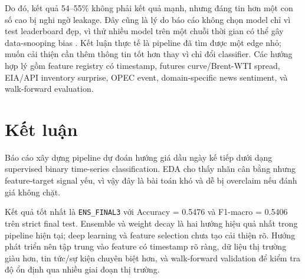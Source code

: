 \documentclass[10pt,a4paper]{article}
\newcommand{\code}[1]{\texttt{#1}}
\begin{document}
Do đó, kết quả 54--55\% không phải kết quả mạnh, nhưng đáng tin hơn một con số cao bị nghi ngờ leakage. Đây cũng là lý do báo cáo không chọn model chỉ vì test leaderboard đẹp, vì thử nhiều model trên một chuỗi thời gian có thể gây data-snooping bias \cite{white2000,cawley2010}. Kết luận thực tế là pipeline đã tìm được một edge nhỏ; muốn cải thiện cần thêm thông tin tốt hơn thay vì chỉ đổi classifier. Các hướng hợp lý gồm feature registry có timestamp, futures curve/Brent-WTI spread, EIA/API inventory surprise, OPEC event, domain-specific news sentiment, và walk-forward evaluation.

\section{Kết luận}

Báo cáo xây dựng pipeline dự đoán hướng giá dầu ngày kế tiếp dưới dạng supervised binary time-series classification. EDA cho thấy nhãn cân bằng nhưng feature-target signal yếu, vì vậy đây là bài toán khó và dễ bị overclaim nếu đánh giá không chặt.

Kết quả tốt nhất là \code{ENS\_FINAL3} với Accuracy = 0.5476 và F1-macro = 0.5406 trên strict final test. Ensemble và weight decay là hai hướng hiệu quả nhất trong pipeline hiện tại; deep learning và feature selection chưa tạo cải thiện rõ. Hướng phát triển nên tập trung vào feature có timestamp rõ ràng, dữ liệu thị trường giàu hơn, tin tức/sự kiện chuyên biệt hơn, và walk-forward validation để kiểm tra độ ổn định qua nhiều giai đoạn thị trường.

\clearpage
\renewcommand{\refname}{Tài liệu tham khảo}
\footnotesize
\sloppy
\end{document}
